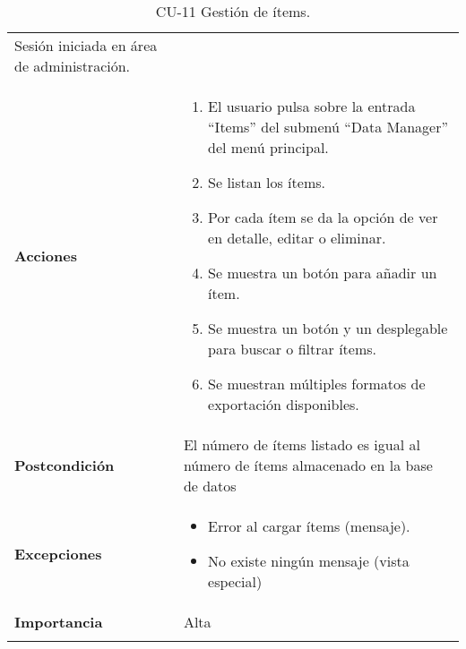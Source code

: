 \begin{longtable}[]{@{}ll@{}}
\begin{minipage}[t]{0.73\columnwidth}
Sesión iniciada en área de administración.\strut
\end{minipage}\tabularnewline
\begin{minipage}[t]{0.21\columnwidth}\raggedright
\textbf{Acciones}\strut
\end{minipage} & \begin{minipage}[t]{0.73\columnwidth}\raggedright
\begin{enumerate}
\def\labelenumi{\arabic{enumi}.}
\tightlist
\item
  El usuario pulsa sobre la entrada ``Items'' del submenú ``Data Manager''
  del menú principal.
\item
  Se listan los ítems.
\item
  Por cada ítem se da la opción de ver en detalle, editar o eliminar.
\item
  Se muestra un botón para añadir un ítem.
\item
  Se muestra un botón y un desplegable para buscar o filtrar ítems.
\item
  Se muestran múltiples formatos de exportación disponibles.
\end{enumerate}\strut
\end{minipage}\tabularnewline
\begin{minipage}[t]{0.21\columnwidth}\raggedright
\textbf{Postcondición}\strut
\end{minipage} & \begin{minipage}[t]{0.73\columnwidth}\raggedright
El número de ítems listado es igual al número de ítems almacenado en la
base de datos\strut
\end{minipage}\tabularnewline
\begin{minipage}[t]{0.21\columnwidth}\raggedright
\textbf{Excepciones}\strut
\end{minipage} & \begin{minipage}[t]{0.73\columnwidth}\raggedright
\begin{itemize}
\tightlist
\item
  Error al cargar ítems (mensaje).
\item
  No existe ningún mensaje (vista especial)
\end{itemize}\strut
\end{minipage}\tabularnewline
\begin{minipage}[t]{0.21\columnwidth}\raggedright
\textbf{Importancia}\strut
\end{minipage} & \begin{minipage}[t]{0.73\columnwidth}\raggedright
Alta\strut
\end{minipage}\tabularnewline
\bottomrule
\caption{CU-11 Gestión de ítems.}
\end{longtable}

